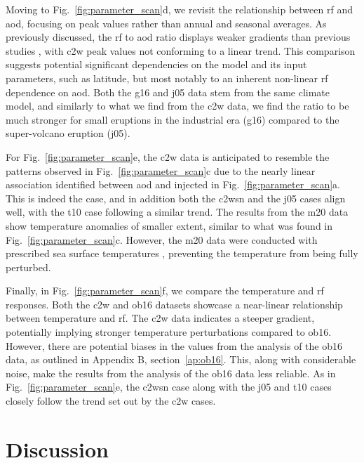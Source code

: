 \documentclass{ametsocV6.1}
\newcommand{\iso}[1][i]{{#1}njected \ce{SO2}}
\begin{document}
Moving to Fig.~\ref{fig:parameter_scan}d, we revisit the relationship between \gls{rf}
and \gls{aod}, focusing on peak values rather than annual and seasonal averages. As
previously discussed, the \gls{rf} to \gls{aod} ratio displays weaker gradients than
previous studies \citep{jones2005, marshall2020, timmreck2010}, with \gls{c2w} peak
values not conforming to a linear trend. This comparison suggests potential significant
dependencies on the model and its input parameters, such as latitude, but most notably
to an inherent non-linear \gls{rf} dependence on \gls{aod}. Both the \gls{g16} and
\gls{j05} data stem from the same climate model, and similarly to what we find from the
\gls{c2w} data, we find the ratio to be much stronger for small eruptions in the
industrial era (\gls{g16}) compared to the super-volcano eruption (\gls{j05}).

For Fig.~\ref{fig:parameter_scan}e, the \gls{c2w} data is anticipated to resemble the
patterns observed in Fig.~\ref{fig:parameter_scan}c due to the nearly linear association
identified between \gls{aod} and \iso{} in Fig.~\ref{fig:parameter_scan}a. This is
indeed the case, and in addition both the \gls{c2wsn} and the \gls{j05} cases align
well, with the \gls{t10} case following a similar trend. The results from the \gls{m20}
data show temperature anomalies of smaller extent, similar to what was found in
Fig.~\ref{fig:parameter_scan}c. However, the \gls{m20} data were conducted with
prescribed sea surface temperatures \citep{marshall2020}, preventing the temperature
from being fully perturbed.

Finally, in Fig.~\ref{fig:parameter_scan}f, we compare the temperature and \gls{rf}
responses. Both the \gls{c2w} and \gls{ob16} datasets showcase a near-linear
relationship between temperature and \gls{rf}. The \gls{c2w} data indicates a steeper
gradient, potentially implying stronger temperature perturbations compared to
\gls{ob16}. However, there are potential biases in the values from the analysis of the
\gls{ob16} data, as outlined in Appendix B, section~\ref{ap:ob16}. This, along with
considerable noise, make the results from the analysis of the \gls{ob16} data less
reliable. As in Fig.~\ref{fig:parameter_scan}e, the \gls{c2wsn} case along with the
\gls{j05} and \gls{t10} cases closely follow the trend set out by the \gls{c2w} cases.

\section{Discussion}\label{sec:discussion}
\end{document}
